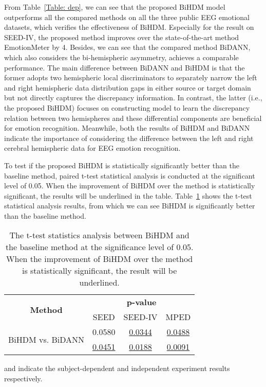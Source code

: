 \documentclass[journal]{IEEEtran}
\begin{document}
From Table~\ref{Table: dep}, we can see that the proposed BiHDM model outperforms all the compared methods on all the three public EEG emotional datasets, which verifies the effectiveness of BiHDM. Especially for the result on SEED-IV, the proposed method improves over the state-of-the-art method EmotionMeter by 4. Besides, we can see that the compared method BiDANN, which also considers the bi-hemispheric asymmetry, achieves a comparable performance. The main difference between BiDANN and BiHDM is that the former adopts two hemispheric local discriminators to separately narrow the left and right hemispheric data distribution gaps in either source or target domain but not directly captures the discrepancy information. In contrast, the latter (i.e., the proposed BiHDM) focuses on constructing model to learn the discrepancy relation between two hemispheres and these differential components are beneficial for emotion recognition. Meanwhile, both the results of BiHDM and BiDANN indicate the importance of considering the difference between the left and right cerebral hemispheric data for EEG emotion recognition.  

To test if the proposed BiHDM is statistically significantly better than the baseline method, paired t-test statistical analysis is conducted at the significant level of 0.05. When the improvement of BiHDM over the method is statistically significant, the results will be underlined in the table. Table~\ref{Table: t-test} shows the t-test statistical analysis results, from which we can see BiHDM is significantly better than the baseline method.
\begin{table}[htb]
	\caption{The t-test statistics analysis between BiHDM and the baseline method at the significance
		level of 0.05. When the improvement of BiHDM over the method is statistically significant, the result will be underlined. }
	\centering
	\renewcommand{\arraystretch}{1.3}
	\begin{threeparttable}		
		\begin{tabular}{|c|ccc|} \hline
			\multirow{2}{*}{\textbf{Method}} & \multicolumn{3}{c|}{\textbf{p-value}} \\ \cline{2-4}
			&  SEED            & SEED-IV          &   MPED\\ \hline
			\multirow{2}{*}{{BiHDM vs. BiDANN}} & 0.0580 & \underline{0.0344} & \underline{0.0488}\\ 
			           & \underline{0.0451} & \underline{0.0188}& \underline{0.0091}\\ \hline
		\end{tabular}
		\begin{tablenotes}[para]
			\footnotesize  and  indicate the subject-dependent and independent experiment results respectively.
		\end{tablenotes}
	\end{threeparttable}
	\label{Table: t-test}
\end{table}
\end{document}
